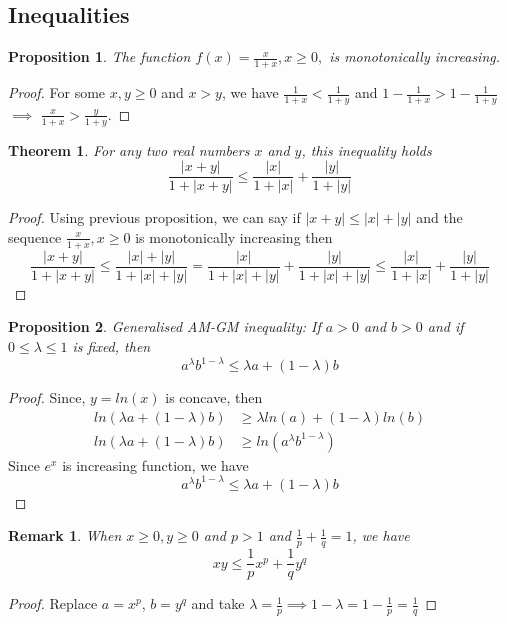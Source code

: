 \documentclass[12pt]{report}
\newtheorem{thm}{Theorem}
\newtheorem*{rem}{Remark}
\newtheorem{prop}{Proposition}
\begin{document}
\subsection*{Inequalities}
\begin{prop} \label{1}
    The function $f(x) = \frac{x}{1+x}, x \geq 0,$ is monotonically increasing. 
\end{prop}
\begin{proof}
    For some $x, y \geq 0$ and $x > y$, we have $\frac{1}{1+x} < \frac{1}{1+y}$ and $1-\frac{1}{1+x} > 1-\frac{1}{1+y}$ $\implies$ $ \frac{x}{1+x} > \frac{y}{1+y}$. 
\end{proof}
\begin{thm}
    For any two real numbers $x$ and $y$, this inequality holds
    $$ \frac{|x+y|}{1+|x+y|} \leq \frac{|x|}{1+|x|} + \frac{|y|}{1+|y|}$$
\end{thm}
\begin{proof}
    Using previous proposition, we can say if $|x+y| \leq |x| + |y|$ and the sequence $\frac{x}{1+x}, x \geq 0$ is monotonically increasing then
    $$ \frac{|x+y|}{1+|x+y|} \leq \frac{|x| + |y|}{1+ |x| + |y|} = \frac{|x|}{1+|x| + |y|} + \frac{|y|}{1+|x| + |y|} \leq \frac{|x|}{1+|x|} + \frac{|y|}{1+|y|}$$ 
\end{proof}
\begin{prop}
    Generalised AM-GM inequality: If $a > 0$ and $b > 0$ and if $0 \leq \lambda \leq 1$ is fixed, then
    $$ a^{\lambda}b^{1-\lambda} \leq \lambda a + (1-\lambda)b$$ 
\end{prop}
\begin{proof}
    Since, $ y = ln(x)$ is concave, then
    \begin{align*}
        ln(\lambda a + (1-\lambda)b) &\geq \lambda ln(a) + (1-\lambda)ln(b)\\
        ln(\lambda a + (1-\lambda)b) &\geq ln(a^{\lambda} b^{1-\lambda})
    \end{align*}
Since $e^x$ is increasing function, we have
$$ a^{\lambda} b^{1-\lambda} \leq \lambda a + (1-\lambda)b$$
\end{proof}
\begin{rem}
    When $x \geq 0, y \geq 0$ and $p > 1$ and $\frac{1}{p} + \frac{1}{q} = 1$, we have 
    $$ xy \leq \frac{1}{p}x^p + \frac{1}{q}y^q$$
\end{rem}
\begin{proof}
    Replace $ a = x^p$, $b = y^q$ and take $\lambda = \frac{1}{p} \implies 1-\lambda = 1- \frac{1}{p} = \frac{1}{q}$
\end{proof}
\end{document}

